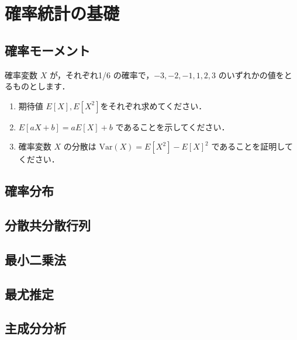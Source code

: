 \section{確率統計の基礎}

\subsection{確率モーメント}
  確率変数 $X$ が，それぞれ1/6 の確率で，$-3, -2, -1, 1, 2, 3$ のいずれかの値をとるものとします．
  \begin{enumerate}[label=(\roman*)]
    \item 期待値 $E[X], E[X^2]$をそれぞれ求めてください．
    \item $E[aX+b] = aE[X] + b$ であることを示してください．
    \item 確率変数 $X$ の分散は $\mathrm{Var}(X) = E[X^2] - E[X]^2$  であることを証明してください．
  \end{enumerate}

\subsection{確率分布}

\subsection{分散共分散行列}

\subsection{最小二乗法}

\subsection{最尤推定}

\subsection{主成分分析}
